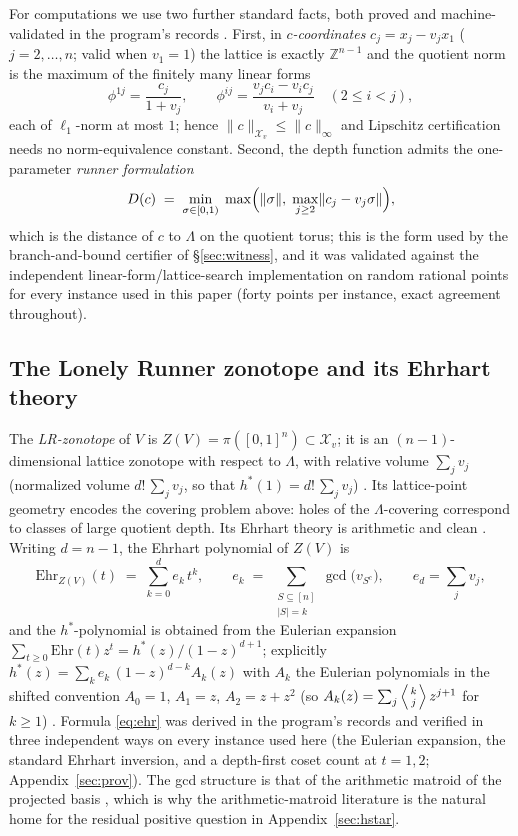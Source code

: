\documentclass[11pt,a4paper]{article}
\numberwithin{equation}{section}
\theoremstyle{plain}
\theoremstyle{definition}
\theoremstyle{remark}
\newcommand{\Z}{\mathbb{Z}}
\newcommand{\wnc}[1]{\lVert #1 \rVert}
\begin{document}
For computations we use two further standard facts, both proved and
machine-validated in the program's records \cite{prog-artifacts}. First,
in \emph{$c$-coordinates} $c_j=x_j-v_jx_1$ ($j=2,\dots,n$; valid when
$v_1=1$) the lattice is exactly $\Z^{n-1}$ and the quotient norm is the
maximum of the finitely many linear forms
\[
\phi^{1j}=\frac{c_j}{1+v_j},\qquad
\phi^{ij}=\frac{v_jc_i-v_ic_j}{v_i+v_j}\quad(2\le i<j),
\]
each of $\ell_1$-norm at most $1$; hence
$\|c\|_{\mathcal{X}_v}\le\|c\|_\infty$ and Lipschitz certification
needs no norm-equivalence constant. Second, the depth function admits the
one-parameter \emph{runner formulation}
\begin{equation}\label{eq:runnerform}
D(c)\;=\;\min_{\sigma\in[0,1)}\;\max\Bigl(\wnc{\sigma},\;
\max_{j\ge 2}\wnc{c_j-v_j\sigma}\Bigr),
\end{equation}
which is the distance of $c$ to $\Lambda$ on the quotient torus; this is
the form used by the branch-and-bound certifier of \S\ref{sec:witness},
and it was validated against the independent linear-form/lattice-search
implementation on random rational points for every instance used in this
paper (forty points per instance, exact agreement throughout).

\subsection{The Lonely Runner zonotope and its Ehrhart theory}

The \emph{LR-zonotope} of $V$ is $Z(V)=\pi([0,1]^n)\subset
\mathcal{X}_v$; it is an $(n{-}1)$-dimensional lattice zonotope with
respect to $\Lambda$, with relative volume $\sum_j v_j$ (normalized
volume $d!\,\sum_j v_j$, so that $h^*(1)=d!\,\sum_j v_j$)
\cite{Shephard,BeckRobins}. Its lattice-point geometry encodes the
covering problem above: holes of the $\Lambda$-covering correspond to
classes of large quotient depth. Its Ehrhart theory is arithmetic and
clean \cite{BeckRobins,dAMoci,StanleyEC}. Writing $d=n-1$, the Ehrhart
polynomial of $Z(V)$ is
\begin{equation}\label{eq:ehr}
\mathrm{Ehr}_{Z(V)}(t)\;=\;\sum_{k=0}^{d} e_k\,t^k,\qquad
e_k\;=\;\sum_{\substack{S\subseteq[n]\\|S|=k}}\gcd\!\bigl(v_{S^c}\bigr),
\qquad e_d=\sum_j v_j,
\end{equation}
and the $h^*$-polynomial is obtained
from the Eulerian expansion
$\sum_{t\ge0}\mathrm{Ehr}(t)z^t=h^*(z)/(1-z)^{d+1}$; explicitly
$h^*(z)=\sum_k e_k\,(1-z)^{d-k}A_k(z)$ with $A_k$ the Eulerian
polynomials in the shifted convention $A_0=1$, $A_1=z$, $A_2=z+z^2$
(so $A_k(z)=\sum_{j}\left\langle{k\atop j}\right\rangle z^{j+1}$ for
$k\ge1$) \cite{Frobenius}. Formula \eqref{eq:ehr} was derived in the
program's records and verified in three independent ways on every
instance used here (the Eulerian expansion, the standard Ehrhart
inversion, and a depth-first coset count at $t=1,2$;
Appendix~\ref{sec:prov}). The gcd structure is that of the arithmetic
matroid of the projected basis \cite{dAMoci}, which is why the
arithmetic-matroid literature is the natural home for the residual
positive question in Appendix~\ref{sec:hstar}.
\end{document}
